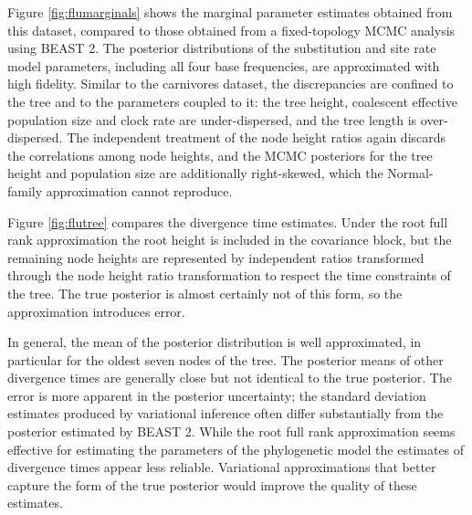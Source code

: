 \documentclass{article}
\begin{document}
Figure \ref{fig:flumarginals} shows the marginal parameter estimates obtained from this dataset, compared to those obtained from a fixed-topology MCMC analysis using BEAST 2. The posterior distributions of the substitution and site rate model parameters, including all four base frequencies, are approximated with high fidelity. Similar to the carnivores dataset, the discrepancies are confined to the tree and to the parameters coupled to it: the tree height, coalescent effective population size and clock rate are under-dispersed, and the tree length is over-dispersed. The independent treatment of the node height ratios again discards the correlations among node heights, and the MCMC posteriors for the tree height and population size are additionally right-skewed, which the Normal-family approximation cannot reproduce.

Figure \ref{fig:flutree} compares the divergence time estimates. Under the root full rank approximation the root height is included in the covariance block, but the remaining node heights are represented by independent ratios transformed through the node height ratio transformation to respect the time constraints of the tree. The true posterior is almost certainly not of this form, so the approximation introduces error.

In general, the mean of the posterior distribution is well approximated, in particular for the oldest seven nodes of the tree. The posterior means of other divergence times are generally close but not identical to the true posterior. The error is more apparent in the posterior uncertainty; the standard deviation estimates produced by variational inference often differ substantially from the posterior estimated by BEAST 2. While the root full rank approximation seems effective for estimating the parameters of the phylogenetic model the estimates of divergence times appear less reliable. Variational approximations that better capture the form of the true posterior would improve the quality of these estimates.
\end{document}

